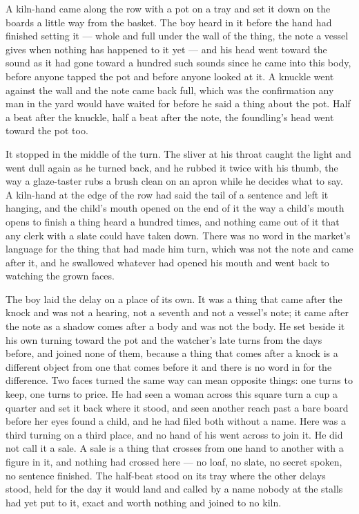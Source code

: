 A kiln-hand came along the row with a pot on a tray and set it down on the boards a little way from the basket. The boy heard  in it before the hand had finished setting it --- whole and full under the wall of the thing, the note a vessel gives when nothing has happened to it yet --- and his head went toward the sound as it had gone toward a hundred such sounds since he came into this body, before anyone tapped the pot and before anyone looked at it. A knuckle went against the wall and the note came back full, which was the confirmation any man in the yard would have waited for before he said a thing about the pot. Half a beat after the knuckle, half a beat after the note, the foundling's head went toward the pot too.

It stopped in the middle of the turn. The sliver at his throat caught the light and went dull again as he turned back, and he rubbed it twice with his thumb, the way a glaze-taster rubs a brush clean on an apron while he decides what to say. A kiln-hand at the edge of the row had said the tail of a sentence and left it hanging, and the child's mouth opened on the end of it the way a child's mouth opens to finish a thing heard a hundred times, and nothing came out of it that any clerk with a slate could have taken down. There was no word in the market's language for the thing that had made him turn, which was not the note and came after it, and he swallowed whatever had opened his mouth and went back to watching the grown faces.

The boy laid the delay on a place of its own. It was a thing that came after the knock and was not a hearing, not a seventh and not a vessel's note; it came after the note as a shadow comes after a body and was not the body. He set beside it his own turning toward the pot and the watcher's late turns from the days before, and joined none of them, because a thing that comes after a knock is a different object from one that comes before it and there is no word in  for the difference. Two faces turned the same way can mean opposite things: one turns to keep, one turns to price. He had seen a woman across this square turn a cup a quarter and set it back where it stood, and seen another reach past a bare board before her eyes found a child, and he had filed both without a name. Here was a third turning on a third place, and no hand of his went across to join it. He did not call it a sale. A sale is a thing that crosses from one hand to another with a figure in it, and nothing had crossed here --- no loaf, no slate, no secret spoken, no sentence finished. The half-beat stood on its tray where the other delays stood, held for the day it would land and called by a name nobody at the stalls had yet put to it, exact and worth nothing and joined to no kiln.

